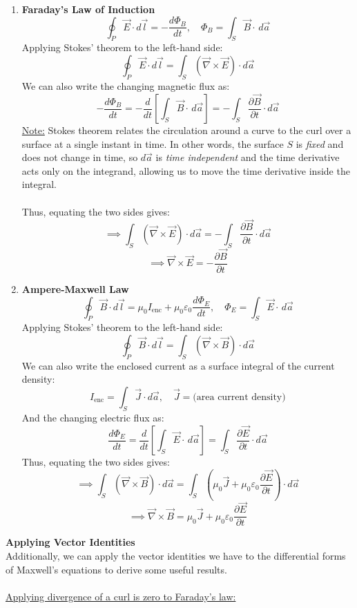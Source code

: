 \documentclass[12pt]{article}
\begin{document}
\begin{enumerate}
    \item \textbf{Faraday's Law of Induction}
\[\oint_P \vec{E}\cdot d\vec{l}=-\frac{d\Phi_B}{dt}, \quad \Phi_B = \int_S \vec{B}\cdot\,d\vec{a}\]
Applying Stokes' theorem to the left-hand side:
\[\oint_P \vec{E}\cdot d\vec{l} = \int_S (\vec{\nabla}\times\vec{E})\cdot d\vec{a}\]
We can also write the changing magnetic flux as:
\[-\frac{d\Phi_B}{dt} = -\frac{d}{dt}\left[\int_S \vec{B}\cdot\,d\vec{a}\right] =-\int_S \frac{\partial \vec{B}}{\partial t}\cdot d\vec{a}\]
\underline{Note:} Stokes theorem relates the circulation around a curve to the curl over a surface at a single instant in time. In other words, the surface $S$ is \textit{fixed} and does not change in time, so $d\vec{a}$ is \textit{time independent} and the time derivative acts only on the integrand, allowing us to move the time derivative inside the integral.\\\\
Thus, equating the two sides gives:
\[\implies \int_S (\vec{\nabla}\times\vec{E})\cdot d\vec{a} = -\int_S \frac{\partial \vec{B}}{\partial t}\cdot d\vec{a}\]
\[\implies \boxed{\vec{\nabla}\times\vec{E} = -\frac{\partial \vec{B}}{\partial t}}\]
    \item \textbf{Ampere-Maxwell Law}
\[\oint_P \vec{B}\cdot d\vec{l}= \mu_0I_{\text{enc}}+\mu_0\varepsilon_0 \frac{d\Phi_E}{dt},\quad \Phi_E=\int_S \vec{E}\cdot\,d\vec{a}\]
Applying Stokes' theorem to the left-hand side:
\[\oint_P \vec{B}\cdot d\vec{l} = \int_S (\vec{\nabla}\times\vec{B})\cdot d\vec{a}\]
We can also write the enclosed current as a surface integral of the current density:
\[I_{\text{enc}}=\int_S \vec{J}\cdot d\vec{a}, \quad \vec{J}=\text{(area current density)}\]
And the changing electric flux as:
\[\frac{d\Phi_E}{dt} = \frac{d}{dt}\left[\int_S \vec{E}\cdot\,d\vec{a}\right] = \int_S \frac{\partial \vec{E}}{\partial t}\cdot d\vec{a}\]
Thus, equating the two sides gives:
\[\implies \int_S (\vec{\nabla}\times\vec{B})\cdot d\vec{a} = \int_S \left(\mu_0\vec{J}+\mu_0\varepsilon_0 \frac{\partial \vec{E}}{\partial t}\right)\cdot d\vec{a}\]
\[\implies \boxed{\vec{\nabla}\times\vec{B} = \mu_0\vec{J}+\mu_0\varepsilon_0 \frac{\partial \vec{E}}{\partial t}}\]
\end{enumerate}
\newpage\noindent
\textbf{Applying Vector Identities}\\
Additionally, we can apply the vector identities we have to the differential forms of Maxwell's equations to derive some useful results.\\\\
\underline{Applying divergence of a curl is zero to Faraday's law:}
\end{document}
